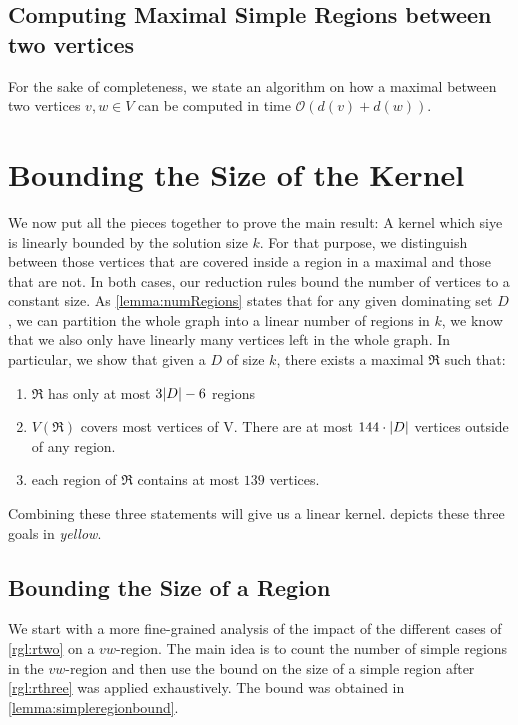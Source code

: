 \subsection{Computing Maximal Simple Regions between two vertices}


For the sake of completeness, we state an algorithm on how a maximal \sr between two vertices $v,w \in V$ can be computed in time $\mathcal{O}(d(v) + d(w))$.

\section{Bounding the Size of the Kernel}

We now put all the pieces together to prove the main result: A kernel which siye is linearly bounded by the solution size $k$. For that purpose, we distinguish between those vertices that are covered inside a region in a maximal \dreg and those that are not. 
In both cases, our reduction rules bound the number of vertices to a constant size.
As \cref{lemma:numRegions} states that for any given dominating set $D$, we can partition the whole graph into a linear number of regions in $k$, we know that we also only have linearly many vertices left in the whole graph.
In particular, we show that given a \sdom $D$ of size $k$, there exists a maximal \dreg $\mathfrak{R}$ such that:

\begin{enumerate}[topsep=0pt,itemsep=-1ex,partopsep=1ex,parsep=1ex]
    \item $\mathfrak{R}$ has only at most $3 \abs{D} - 6$ regions
    \item $V(\mathfrak{R})$ covers most vertices of V. There are at most $144 \cdot \abs{D}$ vertices outside of any region.
    \item each region of $\mathfrak{R}$ contains at most $139$ vertices.
\end{enumerate}

Combining these three statements will give us a linear kernel.  depicts these three goals in \textit{yellow}.
\subsection{Bounding the Size of a Region}

We start with a more fine-grained analysis of the impact of the different cases of \cref{rgl:rtwo} on a $vw$-region. The main idea is to count the number of simple regions in the $vw$-region and then use the bound on the size of a simple region after \cref{rgl:rthree} was applied exhaustively. The bound was obtained in \cref{lemma:simpleregionbound}.   

